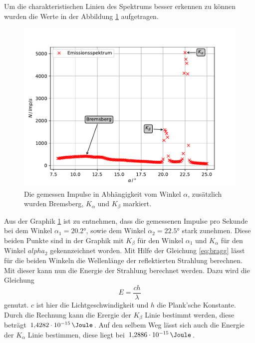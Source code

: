 Um die charakteristischen Linien des Spektrums besser erkennen zu können wurden die Werte in der Abbildung \ref{fig:emission} aufgetragen.
\begin{figure}
  \centering
  \includegraphics[width=\textwidth]{content/data/Emission.pdf}
  \caption{Die gemessen Impulse in Abhängigkeit vom Winkel $\alpha$, zusätzlich wurden Bremsberg, $K_\alpha$ und $K_\beta$ markiert.}
  \label{fig:emission}
\end{figure}

Aus der Graphik \ref{fig:emission} ist zu entnehmen, dass die gemessenen Impulse pro Sekunde bei dem Winkel $\alpha_1 = 20.2 \si{\degree}$, sowie dem Winkel $\alpha_2 = 22.5 \si{\degree}$ stark zunehmen.
Diese beiden Punkte sind in der Graphik mit $K_\beta$ für den Winkel $\alpha_1$ und $K_\alpha$ für den Winkel $alpha_2$ gekennzeichnet worden.
Mit Hilfe der Gleichung \eqref{eq:bragg} lässt für die beiden Winkeln die Wellenlänge der reflektierten Strahlung berechnen.
Mit dieser kann nun die Energie der Strahlung berechnet werden.
Dazu wird die Gleichung
\begin{equation}
  E = \frac{ch}{\lambda}
  \label{eq:energie}
\end{equation}
genutzt.
$c$ ist hier die Lichtgeschwindigkeit und $h$ die Plank'sche Konstante.
Durch die Rechnung kann die Erergie der $K_\beta$ Linie bestimmt werden, diese beträgt $\SI{1.4282e-15}{\Joule}$.
Auf den selbem Weg lässt sich auch die Energie der $K_\alpha$ Linie bestimmen, diese liegt bei $\SI{1.2886e-15}{\Joule}$.

